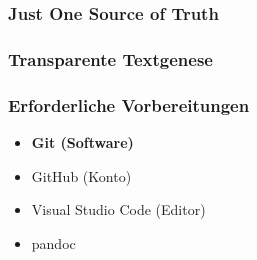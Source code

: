 \documentclass[table]{beamer}
\begin{document}
    \begin{frame}
        \frametitle{Just \textbf{One} Source of Truth}

  
        
    
    \end{frame}

    \begin{frame}
        \frametitle{Transparente Textgenese}

    
        
    
    \end{frame}

    \begin{frame}
        \frametitle{Erforderliche Vorbereitungen}

        \begin{itemize}
            \item \textbf{Git (Software)}
            \item GitHub (Konto)
            \item Visual Studio Code (Editor)
            \item pandoc
        \end{itemize}
    
    \end{frame}
\end{document}
